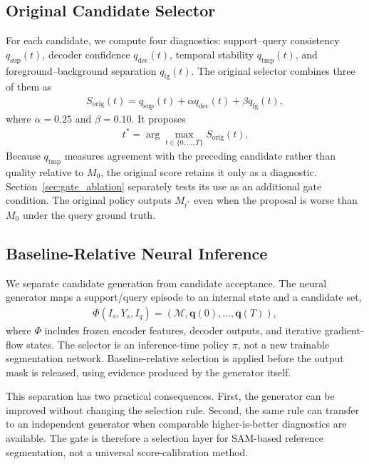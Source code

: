 \documentclass{CVM}
\begin{document}
\subsection{Original Candidate Selector}

For each candidate, we compute four diagnostics: support--query consistency $q_{\mathrm{sup}}(t)$, decoder confidence $q_{\mathrm{dec}}(t)$, temporal stability $q_{\mathrm{tmp}}(t)$, and foreground--background separation $q_{\mathrm{fg}}(t)$. The original selector combines three of them as
\begin{align}
S_{\mathrm{orig}}(t)=q_{\mathrm{sup}}(t)+\alpha q_{\mathrm{dec}}(t)+\beta q_{\mathrm{fg}}(t),
\label{eq:original}
\end{align}
where $\alpha=0.25$ and $\beta=0.10$. It proposes
\begin{align}
t^*=\arg\max_{t\in\{0,\ldots,T\}}S_{\mathrm{orig}}(t).
\label{eq:proposal}
\end{align}
Because $q_{\mathrm{tmp}}$ measures agreement with the preceding candidate rather than quality relative to $M_0$, the original score retains it only as a diagnostic. Section~\ref{sec:gate_ablation} separately tests its use as an additional gate condition.
The original policy outputs $M_{t^*}$ even when the proposal is worse than $M_0$ under the query ground truth.

\subsection{Baseline-Relative Neural Inference}

We separate candidate generation from candidate acceptance. The neural generator maps a support/query episode to an internal state and a candidate set,
\begin{align}
\Phi(I_s,Y_s,I_q)=\left(\mathcal{M},\mathbf{q}(0),\ldots,\mathbf{q}(T)\right),
\label{eq:neural_state}
\end{align}
where $\Phi$ includes frozen encoder features, decoder outputs, and iterative gradient-flow states. The selector is an inference-time policy $\pi$, not a new trainable segmentation network. Baseline-relative selection is applied before the output mask is released, using evidence produced by the generator itself.

This separation has two practical consequences. First, the generator can be improved without changing the selection rule. Second, the same rule can transfer to an independent generator when comparable higher-is-better diagnostics are available. The gate is therefore a selection layer for SAM-based reference segmentation, not a universal score-calibration method.
\end{document}
